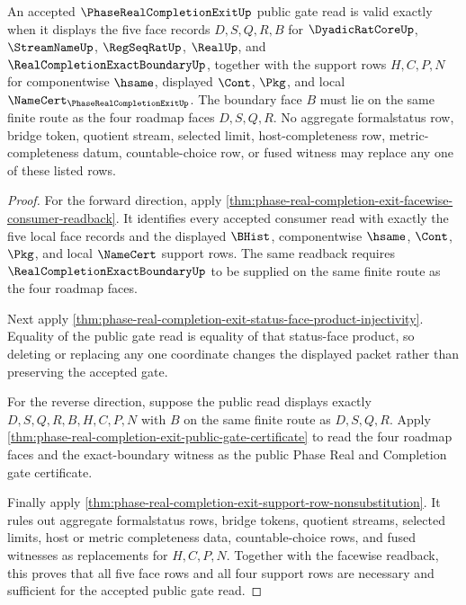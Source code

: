 \begin{theorem}
\label{thm:phase-real-completion-exit-all-support-rows-necessary}
An accepted $\PhaseRealCompletionExitUp$ public gate read is valid exactly when it displays the five face records $D,S,Q,R,B$ for $\DyadicRatCoreUp$, $\StreamNameUp$, $\RegSeqRatUp$, $\RealUp$, and $\RealCompletionExactBoundaryUp$, together with the support rows $H,C,P,N$ for componentwise $\hsame$, displayed $\Cont$, $\Pkg$, and local $\NameCert_{\PhaseRealCompletionExitUp}$. The boundary face $B$ must lie on the same finite route as the four roadmap faces $D,S,Q,R$. No aggregate formalstatus row, bridge token, quotient stream, selected limit, host-completeness row, metric-completeness datum, countable-choice row, or fused witness may replace any one of these listed rows.
\end{theorem}
\begin{proof}
For the forward direction, apply \autoref{thm:phase-real-completion-exit-facewise-consumer-readback}. It identifies every accepted consumer read with exactly the five local face records and the displayed $\BHist$, componentwise $\hsame$, $\Cont$, $\Pkg$, and local $\NameCert$ support rows. The same readback requires $\RealCompletionExactBoundaryUp$ to be supplied on the same finite route as the four roadmap faces.

Next apply \autoref{thm:phase-real-completion-exit-status-face-product-injectivity}. Equality of the public gate read is equality of that status-face product, so deleting or replacing any one coordinate changes the displayed packet rather than preserving the accepted gate.

For the reverse direction, suppose the public read displays exactly $D,S,Q,R,B,H,C,P,N$ with $B$ on the same finite route as $D,S,Q,R$. Apply \autoref{thm:phase-real-completion-exit-public-gate-certificate} to read the four roadmap faces and the exact-boundary witness as the public Phase Real and Completion gate certificate.

Finally apply \autoref{thm:phase-real-completion-exit-support-row-nonsubstitution}. It rules out aggregate formalstatus rows, bridge tokens, quotient streams, selected limits, host or metric completeness data, countable-choice rows, and fused witnesses as replacements for $H,C,P,N$. Together with the facewise readback, this proves that all five face rows and all four support rows are necessary and sufficient for the accepted public gate read.
\end{proof}

